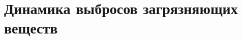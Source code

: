 









\section{Динамика выбросов загрязняющих веществ}
\begin{frame}{\insertsectionhead}
\end{frame}










